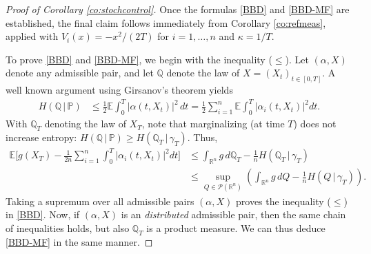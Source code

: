 \documentclass[11pt,reqno]{amsart}
\numberwithin{equation}{section}
\theoremstyle{definition}
\def\E{{\mathbb E}}
\def\R{{\mathbb R}}
\def\PP{{\mathbb P}}
\def\P{{\mathcal P}}
\def\QQ{{\mathbb Q}}
\begin{document}
\begin{proof}[Proof of Corollary \ref{co:stochcontrol}]
	Once the formulas \eqref{BBD} and \eqref{BBD-MF} are established,  the final claim follows immediately from Corollary \ref{co:refmeas}, applied with $V_i(x)=-x^2/(2T)$ for $i=1,\ldots,n$ and $\kappa=1/T$.
	
	
	To prove \eqref{BBD} and \eqref{BBD-MF}, we begin with the inequality ($\le$). Let $(\alpha,X)$ denote any admissible pair, and let $\QQ$ denote the law of $X=(X_t)_{t \in [0,T]}$.
	A well known argument using Girsanov's theorem \cite[Proposition 1]{lehec2013representation} yields
	\begin{align*}
		H(\QQ\,|\,\PP) &\le \frac12\E\int_0^T|\alpha(t,X_t)|^2\,dt = \frac12 \sum_{i=1}^n \E\int_0^T |\alpha_i(t,X_t)|^2dt.
	\end{align*}
	With $\QQ_T$ denoting the law of $X_T$, note that marginalizing (at time $T$) does not increase entropy: $H(\QQ\,|\,\PP) \ge H(\QQ_T\,|\,\gamma_T)$. Thus,
	\begin{align*}
		\E\Bigg[ g(X_T) -  \frac{1}{2n} \sum_{i=1}^n \int_0^T |\alpha_i(t,X_t)|^2dt\Bigg] &\le \int_{\R^n} g\,d\QQ_T - \frac{1}{n}H(\QQ_T\,|\,\gamma_T) \\
		&\le \sup_{Q \in \P(\R^n)} \left(\int_{\R^n} g\,dQ - \frac{1}{n}H(Q\,|\,\gamma_T)\right).
	\end{align*}
	Taking a supremum over all admissible pairs $(\alpha,X)$ proves the inequality ($\le$) in \eqref{BBD}.
	Now, if $(\alpha,X)$ is an \emph{distributed} admissible pair, then the same chain of inequalities holds, but also $\QQ_T$ is a product measure. We can thus deduce \eqref{BBD-MF} in the same manner.
	
	


\end{proof}
\end{document}
